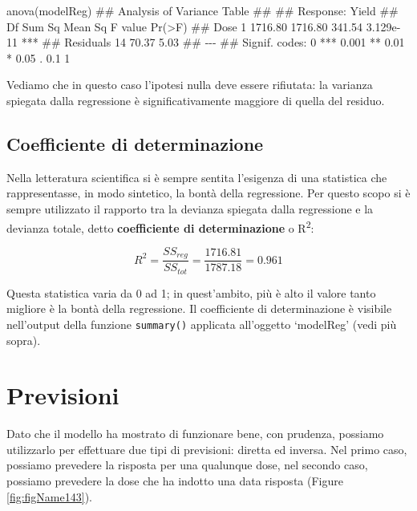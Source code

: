 \documentclass[a4paper,12pt,oneside]{book}
\newenvironment{Shaded}{\begin{snugshade}}{\end{snugshade}}
\newcommand{\DocumentationTok}[1]{#1}
\newcommand{\FunctionTok}[1]{#1}
\newcommand{\NormalTok}[1]{#1}
\begin{document}
\begin{Shaded}
\begin{Highlighting}[]
\FunctionTok{anova}\NormalTok{(modelReg)}
\DocumentationTok{\#\# Analysis of Variance Table}
\DocumentationTok{\#\# }
\DocumentationTok{\#\# Response: Yield}
\DocumentationTok{\#\#           Df  Sum Sq Mean Sq F value    Pr(\textgreater{}F)    }
\DocumentationTok{\#\# Dose       1 1716.80 1716.80  341.54 3.129e{-}11 ***}
\DocumentationTok{\#\# Residuals 14   70.37    5.03                      }
\DocumentationTok{\#\# {-}{-}{-}}
\DocumentationTok{\#\# Signif. codes:  0 \textquotesingle{}***\textquotesingle{} 0.001 \textquotesingle{}**\textquotesingle{} 0.01 \textquotesingle{}*\textquotesingle{} 0.05 \textquotesingle{}.\textquotesingle{} 0.1 \textquotesingle{} \textquotesingle{} 1}
\end{Highlighting}
\end{Shaded}

Vediamo che in questo caso l'ipotesi nulla deve essere rifiutata: la varianza spiegata dalla regressione è significativamente maggiore di quella del residuo.

\hypertarget{coefficiente-di-determinazione}{%
\subsection{Coefficiente di determinazione}\label{coefficiente-di-determinazione}}

Nella letteratura scientifica si è sempre sentita l'esigenza di una statistica che rappresentasse, in modo sintetico, la bontà della regressione. Per questo scopo si è sempre utilizzato il rapporto tra la devianza spiegata dalla regressione e la devianza totale, detto \textbf{coefficiente di determinazione} o R\textsuperscript{2}:

\[R^2 = \frac{SS_{reg}}{SS_{tot}} = \frac{1716.81}{1787.18} = 0.961\]

Questa statistica varia da 0 ad 1; in quest'ambito, più è alto il valore tanto migliore è la bontà della regressione. Il coefficiente di determinazione è visibile nell'output della funzione \texttt{summary()} applicata all'oggetto `modelReg' (vedi più sopra).

\hypertarget{previsioni}{%
\section{Previsioni}\label{previsioni}}

Dato che il modello ha mostrato di funzionare bene, con prudenza, possiamo utilizzarlo per effettuare due tipi di previsioni: diretta ed inversa. Nel primo caso, possiamo prevedere la risposta per una qualunque dose, nel secondo caso, possiamo prevedere la dose che ha indotto una data risposta (Figure \ref{fig:figName143}).
\end{document}
